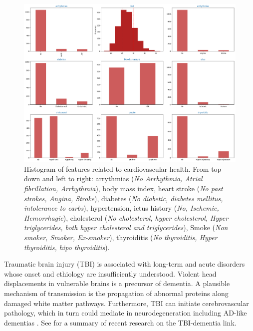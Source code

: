 \documentclass[11pt]{article}
\theoremstyle{definition}
\theoremstyle{remark}
\begin{document}
\begin{figure}[H]
        \centering
        \includegraphics[keepaspectratio, width=\linewidth]{figures/Fig_cardio}
        \caption{Histogram of features related to cardiovascular health. From top down and left to right: arrythmias (\emph{No Arrhythmia, Atrial fibrillation, Arrhythmia}), body mass index, heart stroke (\emph{No past strokes, Angina, Stroke}), diabetes (\emph{No diabetic, diabetes mellitus, intolerance to carbs}), hypertension, ictus history (\emph{No, Ischemic, Hemorrhagic}), cholesterol (\emph{No cholesterol, hyper cholesterol, Hyper triglycerides, both hyper cholesterol and triglycerides}), Smoke (\emph{Non smoker, Smoker, Ex-smoker}), thyroiditis (\emph{No thyroiditis, Hyper thyroiditis, hipo thyroiditis}). } 
        \label{fig:cardio}
\end{figure}



Traumatic brain injury (TBI) is associated with long-term and acute disorders whose onset and ethiology are insufficiently understood. Violent head displacements in vulnerable brains is a precursor of dementia. A plausible mechanism of transmission is the propagation of abnormal proteins along damaged white matter pathways. Furthermore, TBI can initiate cerebrovascular pathology, which in turn could mediate in neurodegeneration including AD-like dementias \cite{ramos2018traumatic}. See \cite{mendez2017relationship} for a summary of recent research on the TBI-dementia link. 
\end{document}

